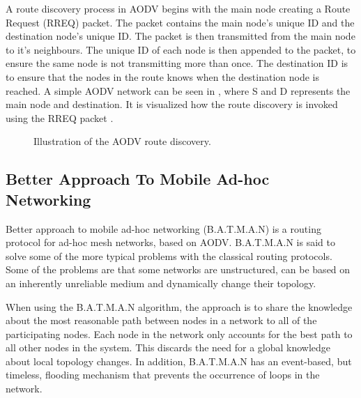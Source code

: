 A route discovery process in AODV begins with the main node creating a Route Request (RREQ) packet.
The packet contains the main node's unique ID and the destination node's unique ID.
The packet is then transmitted from the main node to it's neighbours.
The unique ID of each node is then appended to the packet, to ensure the same node is not transmitting more than once.
The destination ID is to ensure that the nodes in the route knows when the destination node is reached.
A simple AODV network can be seen in , where S and D represents the main node and destination. It is visualized how the route discovery is invoked using the RREQ packet \cite{AOVD2}.

\begin{figure}[!h]
	\centering
	\caption{Illustration of the AODV route discovery.}
	\label{fig:AODVfigure}
\end{figure}

\subsection{Better Approach To Mobile Ad-hoc Networking}
Better approach to mobile ad-hoc networking (B.A.T.M.A.N) is a routing protocol for ad-hoc mesh networks, based on AODV. 
B.A.T.M.A.N is said to solve some of the more typical problems with the classical routing protocols.
Some of the problems are that some networks are unstructured, can be based on an inherently unreliable medium and dynamically change their topology\cite{BATMAN}.

When using the B.A.T.M.A.N algorithm, the approach is to share the knowledge about the most reasonable path between nodes in a network to all of the participating nodes.
Each node in the network only accounts for the best path to all other nodes in the system.
This discards the need for a global knowledge about local topology changes.
In addition, B.A.T.M.A.N has an event-based, but timeless, flooding mechanism that prevents the occurrence of loops in the network.

